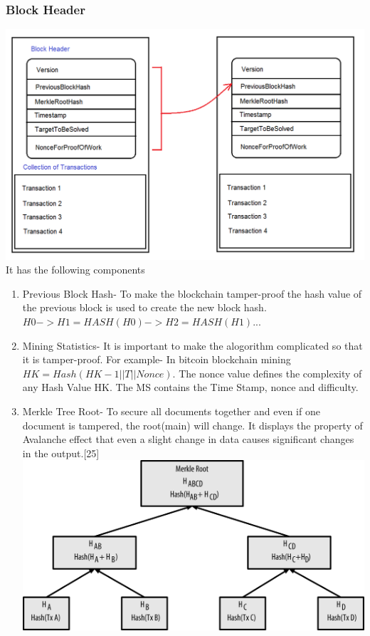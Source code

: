 \documentclass{report}
\begin{document}
\subsubsection{Block Header}
\includegraphics[scale=0.25]{chained_blocks.png}
\\
It has the following components
\begin{enumerate}
   \item Previous Block Hash- To make the blockchain tamper-proof the hash value of the previous block is used to create the new block hash.\\ $ H0 -> H1= HASH(H0) -> H2= HASH(H1)... $
   \item Mining Statistics- It is important to make the alogorithm complicated so that it is tamper-proof. For example- In bitcoin blockchain mining $HK =Hash( HK-1||T ||Nonce)$. The nonce value defines the complexity of any Hash Value HK. The MS contains the Time Stamp, nonce and difficulty.
   \item Merkle Tree Root- To secure all documents together and even if one document is tampered, the root(main) will change. It displays the property of Avalanche effect that even a slight change in data causes significant changes in the output.[25]
   \\
  \includegraphics[scale=0.25]{Picture1.png}

\end{enumerate}
\end{document}
